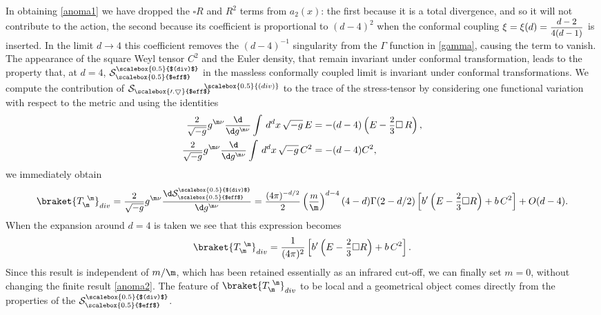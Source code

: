 \documentclass[a4paper,11pt,openright,twoside]{book}
\let\n=\nu      \let\x=\xi     \let\p=\pi      \let\r=\rho
\let\G=\Gamma  \let\D=\Delta \let\Q=\Theta  \let\L=\Lambda
\newcommand{\sdfrac}[2]{\mbox{\small$\displaystyle\frac{#1}{#2}$}}
\numberwithin{equation}{section}
\begin{document}
{{{{		In obtaining \eqref{anoma1} we have dropped the $\square R$ and $R^2$ terms from $a_2(x)$: the first because it is a total divergence, and so it will not contribute to the action, the second because its coefficient is proportional to $(d-4)^2$ when the conformal coupling $\x=\x(d)=\sdfrac{d-2}{4(d-1)}$ is inserted. In the limit $d\to4$ this coefficient removes the $(d-4)^{-1}$ singularity from the $\G$ function in \eqref{gamma}, causing the term to vanish. The appearance of the square Weyl tensor $C^2$ and the Euler density, that remain invariant under conformal transformation, leads to the property that, at $d=4$,  $\mathcal{S}^{\scalebox{0.5}{$(div)$}}_{\scalebox{0.5}{$eff$}}$ in the massless conformally coupled limit is invariant under conformal transformations.
		We compute the contribution of $\mathcal{S_{\scalebox{0.5}{$eff$}}}{}^{\hspace{-0.25cm}\scalebox{0.5}{(div)}}$ to the trace of the stress-tensor by considering one functional variation with respect to the metric and 
		using the identities 
		\begin{equation}
			\begin{split}
				\sdfrac{2}{\sqrt{-g}}g^{\m\n}\sdfrac{\d}{\d g^{\m\n}}\int\,d^dx\,\sqrt{-g}\,E&=-(d-4)\left(E-\sdfrac{2}{3}\square\,R\right),\\
				\sdfrac{2}{\sqrt{-g}}g^{\m\n}\sdfrac{\d}{\d g^{\m\n}}\int\,d^dx\,\sqrt{-g}\,C^2&=-(d-4)C^2,
			\end{split}\label{rel}
		\end{equation}
		we immediately obtain
		\begin{equation}
			\braket{T_\m^{\ \m}}_{div}=\sdfrac{2}{\sqrt{-g}}g^{\m\n}\sdfrac{\d\mathcal{S}^{\scalebox{0.5}{$(div)$}}_{\scalebox{0.5}{$eff$}}}{\d g^{\m\n}}=\sdfrac{(4\pi)^{-d/2}}{2}\left(\sdfrac{m}{\m}\right)^{d-4}(4-d)\G(2-d/2)\left[b'\left(E-\sdfrac{2}{3}\square R\right)+b\,C^2\right]+O(d-4).
		\end{equation}
		When the expansion around $d=4$ is taken we see that this expression becomes
		\begin{equation}
			\braket{T_\m^{\ \m}}_{div}=\frac{1}{(4\pi)^2}\left[b'\left(E-\sdfrac{2}{3}\square R\right)+b\,C^2\right].\label{anoma2}
		\end{equation}
		Since this result is independent of $m/\m$, which has been retained essentially as an infrared cut-off, we can finally set $m=0$, without changing the finite result \eqref{anoma2}. The feature of $\braket{T_{\m}^{\ \m}}_{div}$ to be local and a geometrical object comes directly from the properties of the $\mathcal{S}^{\scalebox{0.5}{$(div)$}}_{\scalebox{0.5}{$eff$}}$. 
}}}}
\end{document}
